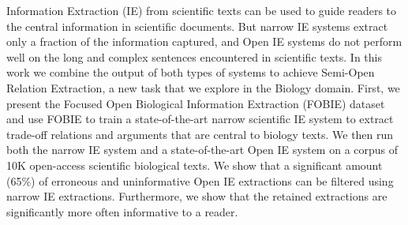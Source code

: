 Information Extraction (IE) from scientific texts can be used to guide readers to the central information in scientific documents. But narrow IE systems extract only a fraction of the information captured, and Open IE systems do not perform well on the long and complex sentences encountered in scientific texts. In this work we combine the output of both types of systems to achieve Semi-Open Relation Extraction, a new task that we explore in the Biology domain. First, we present the Focused Open Biological Information Extraction (FOBIE) dataset and use FOBIE to train a state-of-the-art narrow scientific IE system to extract trade-off relations and arguments that are central to biology texts. We then run both the narrow IE system and a state-of-the-art Open IE system on a corpus of 10K open-access scientific biological texts. We show that a significant amount (65\%) of erroneous and uninformative Open IE extractions can be filtered using narrow IE extractions. Furthermore, we show that the retained extractions are significantly more often informative to a reader.
